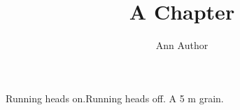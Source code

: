 \documentclass[runningheads]{svmult}
\begin{document}
\title*{A Chapter}
\author{Ann Author}
\maketitle
\makeatletter\if@runhead Running heads on.\else Running heads off.\fi\makeatother
A 5 \micro m grain.
\end{document}

